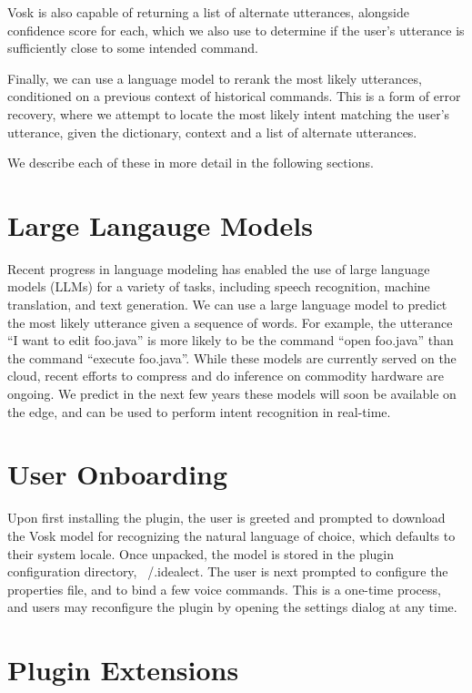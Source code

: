 \documentclass[conference]{IEEEtran}
\begin{document}
Vosk is also capable of returning a list of alternate utterances, alongside confidence score for each, which we also use to determine if the user's utterance is sufficiently close to some intended command.

Finally, we can use a language model to rerank the most likely utterances, conditioned on a previous context of historical commands. This is a form of error recovery, where we attempt to locate the most likely intent matching the user's utterance, given the dictionary, context and a list of alternate utterances.

We describe each of these in more detail in the following sections.

\section{Large Langauge Models}

Recent progress in language modeling has enabled the use of large language models (LLMs) for a variety of tasks, including speech recognition, machine translation, and text generation. We can use a large language model to predict the most likely utterance given a sequence of words. For example, the utterance ``I want to edit foo.java'' is more likely to be the command ``open foo.java'' than the command ``execute foo.java''. While these models are currently served on the cloud, recent efforts to compress and do inference on commodity hardware are ongoing. We predict in the next few years these models will soon be available on the edge, and can be used to perform intent recognition in real-time.

\section{User Onboarding}

Upon first installing the plugin, the user is greeted and prompted to download the Vosk model for recognizing the natural language of choice, which defaults to their system locale. Once unpacked, the model is stored in the plugin configuration directory, ~/.idealect. The user is next prompted to configure the properties file, and to bind a few voice commands. This is a one-time process, and users may reconfigure the plugin by opening the settings dialog at any time.

\section{Plugin Extensions}
\end{document}
